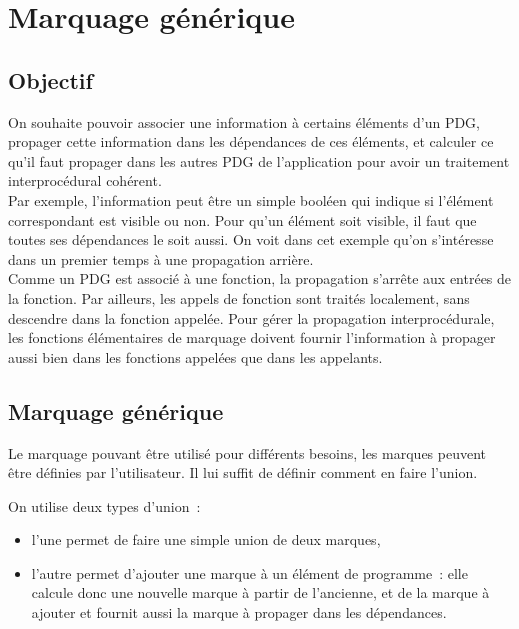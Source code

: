 \chapter{Marquage générique}\label{sec-mark}

\section{Objectif}

On souhaite pouvoir associer une information à certains éléments d'un PDG,
propager cette information dans les dépendances de ces éléments,
et calculer ce qu'il faut propager dans les autres PDG de l'application
pour avoir un traitement interprocédural cohérent. \\

Par exemple, l'information peut être un simple booléen qui indique si l'élément
correspondant est visible ou non. Pour qu'un élément soit visible, il faut que
toutes ses dépendances le soit aussi.
On voit dans cet exemple qu'on s'intéresse dans un premier temps à une
propagation arrière.\\

Comme un PDG est associé à une fonction, la propagation s'arrête aux entrées
de la fonction. Par ailleurs, les appels de fonction sont traités localement,
sans descendre dans la fonction appelée.
Pour gérer la propagation interprocédurale, les fonctions élémentaires de
marquage doivent fournir l'information à propager aussi bien dans les fonctions
appelées que dans les appelants.

\section{Marquage générique}

Le marquage pouvant être utilisé pour différents besoins,
les marques peuvent être définies par l'utilisateur.
Il lui suffit de définir comment en faire l'union.

On utilise deux types d'union~:
\begin{itemize}
  \item l'une permet de faire une simple union de deux marques,
  \item l'autre permet d'ajouter une marque à un élément de programme~:
    elle calcule donc une nouvelle marque à partir de l'ancienne,
    et de la marque à ajouter et fournit aussi la marque à propager dans les
    dépendances.
\end{itemize}

